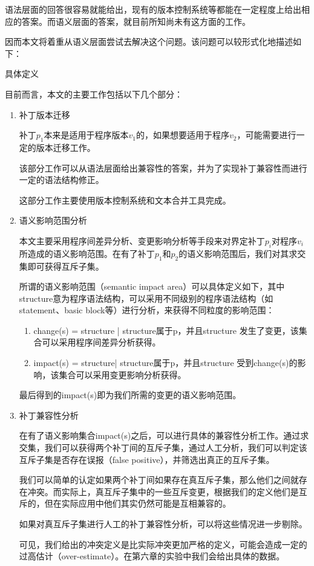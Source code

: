语法层面的回答很容易就能给出，现有的版本控制系统等都能在一定程度上给出相应的答案。而语义层面的答案，就目前所知尚未有这方面的工作。

因而本文将着重从语义层面尝试去解决这个问题。该问题可以较形式化地描述如下：

\begin{problem}
	\label {compatible}
	具体定义
\end{problem}

目前而言，本文的主要工作包括以下几个部分：

\begin{enumerate}
	\item
	补丁版本迁移

补丁$p_1$本来是适用于程序版本$v_1$的，如果想要适用于程序$v_2$，可能需要进行一定的版本迁移工作。

该部分工作可以从语法层面给出兼容性的答案，并为了实现补丁兼容性而进行一定的语法结构修正。

这部分工作主要使用版本控制系统和文本合并工具完成。

	\item
	语义影响范围分析

本文主要采用程序间差异分析、变更影响分析等手段来对界定补丁$p_i$对程序$v_i$所造成的语义影响范围。在有了补丁$p_1$和$p_2$的语义影响范围后，我们对其求交集即可获得互斥子集。

所谓的语义影响范围（semantic impact area）可以具体定义如下，其中structure意为程序语法结构，可以采用不同级别的程序语法结构（如statement、basic block等）进行分析，来获得不同粒度的影响范围：
	\begin{enumerate}
		\item
		change(s) = { structure | structure属于p，并且structure 发生了变更}，该集合可以采用程序间差异分析获得。
		
		\item
		impact(s) = {structure| structure属于p，并且structure 受到change(s)的影响}，该集合可以采用变更影响分析获得。
		
	\end{enumerate}
最后得到的impact(s)即为我们所需的变更的语义影响范围。

	\item
	补丁兼容性分析

在有了语义影响集合impact(s)之后，可以进行具体的兼容性分析工作。通过求交集，我们可以获得两个补丁间的互斥子集，通过人工分析，我们可以判定该互斥子集是否存在误报（false positive），并筛选出真正的互斥子集。

我们可以简单的认定如果两个补丁间如果存在真互斥子集，那么他们之间就存在冲突。而实际上，真互斥子集中的一些互斥变更，根据我们的定义他们是互斥的，但在实际应用中他们其实仍然可能是互相兼容的。

如果对真互斥子集进行人工的补丁兼容性分析，可以将这些情况进一步剔除。

可见，我们给出的冲突定义是比实际冲突更加严格的定义，可能会造成一定的过高估计（over-estimate）。在第六章的实验中我们会给出具体的数据。


\end{enumerate}

